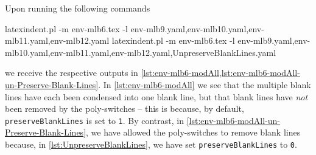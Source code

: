 Upon running the following commands
\begin{sidebyside}
\begin{commandshell}
latexindent.pl -m env-mlb6.tex -l env-mlb9.yaml,env-mlb10.yaml,env-mlb11.yaml,env-mlb12.yaml
latexindent.pl -m env-mlb6.tex -l env-mlb9.yaml,env-mlb10.yaml,env-mlb11.yaml,env-mlb12.yaml,UnpreserveBlankLines.yaml
\end{commandshell}
\end{sidebyside}
we receive the respective outputs in \cref{lst:env-mlb6-modAll,lst:env-mlb6-modAll-un-Preserve-Blank-Lines}. In 
\cref{lst:env-mlb6-modAll} we see that the multiple blank lines have each been condensed into one blank line, 
but that blank lines have \emph{not} been removed by the poly-switches -- this is because, by default, \texttt{preserveBlankLines}
is set to \texttt{1}. By contrast, in \cref{lst:env-mlb6-modAll-un-Preserve-Blank-Lines}, we have allowed
the poly-switches to remove blank lines because, in \cref{lst:UnpreserveBlankLines}, we have set \texttt{preserveBlankLines} to \texttt{0}.

\begin{minipage}{.30\linewidth}
\end{minipage}
\hfill
\begin{minipage}{.7\linewidth}
\end{minipage}
